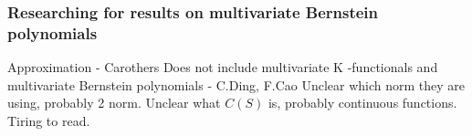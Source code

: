 

\subsubsection{Researching for results on multivariate Bernstein polynomials}

\begin{outline}
  \1 Approximation - Carothers
  \2 Does not include multivariate
  \1 K -functionals and multivariate Bernstein polynomials - C.Ding, F.Cao
  \2 Unclear which norm they are using, probably 2 norm.
  Unclear what $C(S)$ is, probably continuous functions.
  Tiring to read.
  \1 
\end{outline}

